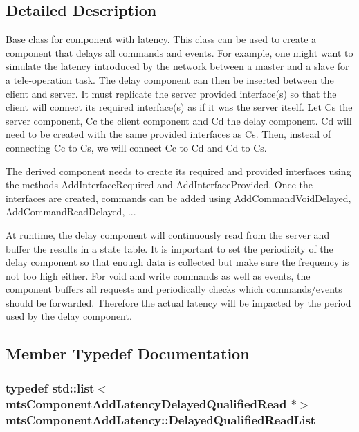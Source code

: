 \subsection{Detailed Description}
Base class for component with latency. This class can be used to create a component that delays all commands and events. For example, one might want to simulate the latency introduced by the network between a master and a slave for a tele-\/operation task. The delay component can then be inserted between the client and server. It must replicate the server provided interface(s) so that the client will connect its required interface(s) as if it was the server itself. Let Cs the server component, Cc the client component and Cd the delay component. Cd will need to be created with the same provided interfaces as Cs. Then, instead of connecting Cc to Cs, we will connect Cc to Cd and Cd to Cs.

The derived component needs to create its required and provided interfaces using the methods Add\+Interface\+Required and Add\+Interface\+Provided. Once the interfaces are created, commands can be added using Add\+Command\+Void\+Delayed, Add\+Command\+Read\+Delayed, ...

At runtime, the delay component will continuously read from the server and buffer the results in a state table. It is important to set the periodicity of the delay component so that enough data is collected but make sure the frequency is not too high either. For void and write commands as well as events, the component buffers all requests and periodically checks which commands/events should be forwarded. Therefore the actual latency will be impacted by the period used by the delay component. 

\subsection{Member Typedef Documentation}
\hypertarget{classmts_component_add_latency_a00e005acc3d0af37d43abee413e92d1e}{}
\subsubsection[{Delayed\+Qualified\+Read\+List}]{\setlength{\rightskip}{0pt plus 5cm}typedef std\+::list$<$mts\+Component\+Add\+Latency\+Delayed\+Qualified\+Read $\ast$$>$ {\bf mts\+Component\+Add\+Latency\+::\+Delayed\+Qualified\+Read\+List}\hspace{0.3cm}{\ttfamily [protected]}}\label{classmts_component_add_latency_a00e005acc3d0af37d43abee413e92d1e}
\hypertarget{classmts_component_add_latency_a527c29b91f407598cb31a8113d453610}{}

